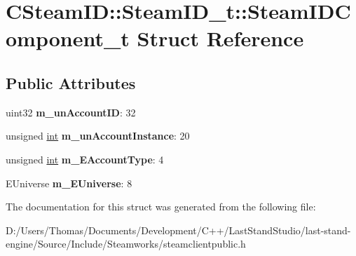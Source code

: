 \hypertarget{structCSteamID_1_1SteamID__t_1_1SteamIDComponent__t}{}\section{C\+Steam\+I\+D\+:\+:Steam\+I\+D\+\_\+t\+:\+:Steam\+I\+D\+Component\+\_\+t Struct Reference}
\label{structCSteamID_1_1SteamID__t_1_1SteamIDComponent__t}
\subsection*{Public Attributes}
\begin{DoxyCompactItemize}
\item 
\hypertarget{structCSteamID_1_1SteamID__t_1_1SteamIDComponent__t_a475adb618e46a2ef15d7d56878622763}{}uint32 {\bfseries m\+\_\+un\+Account\+I\+D}\+: 32\label{structCSteamID_1_1SteamID__t_1_1SteamIDComponent__t_a475adb618e46a2ef15d7d56878622763}

\item 
\hypertarget{structCSteamID_1_1SteamID__t_1_1SteamIDComponent__t_a4a717deb712fb5997a758c2140a6fc14}{}unsigned \hyperlink{SDL__thread_8h_a6a64f9be4433e4de6e2f2f548cf3c08e}{int} {\bfseries m\+\_\+un\+Account\+Instance}\+: 20\label{structCSteamID_1_1SteamID__t_1_1SteamIDComponent__t_a4a717deb712fb5997a758c2140a6fc14}

\item 
\hypertarget{structCSteamID_1_1SteamID__t_1_1SteamIDComponent__t_a8fdc153414218d0f9d3b4213b199d089}{}unsigned \hyperlink{SDL__thread_8h_a6a64f9be4433e4de6e2f2f548cf3c08e}{int} {\bfseries m\+\_\+\+E\+Account\+Type}\+: 4\label{structCSteamID_1_1SteamID__t_1_1SteamIDComponent__t_a8fdc153414218d0f9d3b4213b199d089}

\item 
\hypertarget{structCSteamID_1_1SteamID__t_1_1SteamIDComponent__t_a2ad40ea35f1166ba6f7579ae664cedda}{}E\+Universe {\bfseries m\+\_\+\+E\+Universe}\+: 8\label{structCSteamID_1_1SteamID__t_1_1SteamIDComponent__t_a2ad40ea35f1166ba6f7579ae664cedda}

\end{DoxyCompactItemize}


The documentation for this struct was generated from the following file\+:\begin{DoxyCompactItemize}
\item 
D\+:/\+Users/\+Thomas/\+Documents/\+Development/\+C++/\+Last\+Stand\+Studio/last-\/stand-\/engine/\+Source/\+Include/\+Steamworks/steamclientpublic.\+h\end{DoxyCompactItemize}
